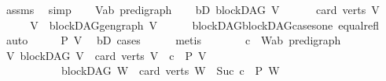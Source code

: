 \begin{isabellebody}
\ assms{\isacharparenleft}{\kern0pt}{}{\isacharparenright}{\kern0pt}\ \isamarkupfalse%
\ simp\isanewline
{}\isamarkupfalse%
\isanewline
\ \ \isamarkupfalse%
\ V{\isacharcolon}{\kern0pt}{\isacharcolon}{\kern0pt}{\isachardoublequoteopen}{\isacharparenleft}{\kern0pt}{\isacharprime}{\kern0pt}a{\isacharcomma}{\kern0pt}{\isacharprime}{\kern0pt}b{\isacharparenright}{\kern0pt}\ pre{\isacharunderscore}{\kern0pt}digraph{\isachardoublequoteclose}\isanewline
\ \ \isamarkupfalse%
\ bD{\isacharcolon}{\kern0pt}\ {\isachardoublequoteopen}blockDAG\ V{\isachardoublequoteclose}\ \isanewline
\ \ \ \ \ {\isachardoublequoteopen}card\ {\isacharparenleft}{\kern0pt}verts\ V{\isacharparenright}{\kern0pt}\ {\isacharequal}{\kern0pt}\ {}{\isachardoublequoteclose}\isanewline
\ \ \isamarkupfalse%
\ \isamarkupfalse%
\ {\isachardoublequoteopen}V\ {\isacharequal}{\kern0pt}\ blockDAG{\isachardot}{\kern0pt}gen{\isacharunderscore}{\kern0pt}graph\ V{\isachardoublequoteclose}\isanewline
\ \ \ \ \isamarkupfalse%
\ blockDAG{\isachardot}{\kern0pt}blockDAG{\isacharunderscore}{\kern0pt}cases{\isacharunderscore}{\kern0pt}one\ equal{\isacharunderscore}{\kern0pt}refl\ \ \isamarkupfalse%
\ auto\isanewline
\ \ \isamarkupfalse%
\ \isamarkupfalse%
\ {\isachardoublequoteopen}P\ V{\isachardoublequoteclose}\ \isamarkupfalse%
\ bD\ cases{\isacharparenleft}{\kern0pt}{}{\isacharparenright}{\kern0pt}\isanewline
\ \ \ \ \isamarkupfalse%
\ metis\ \ \isanewline
{}\isamarkupfalse%
\ \isanewline
\ \ \isamarkupfalse%
\ c\ \ W{\isacharcolon}{\kern0pt}{\isacharcolon}{\kern0pt}{\isachardoublequoteopen}{\isacharparenleft}{\kern0pt}{\isacharprime}{\kern0pt}a{\isacharcomma}{\kern0pt}{\isacharprime}{\kern0pt}b{\isacharparenright}{\kern0pt}\ pre{\isacharunderscore}{\kern0pt}digraph{\isachardoublequoteclose}\isanewline
\ \ \isamarkupfalse%
\ {\isachardoublequoteopen}{\isacharparenleft}{\kern0pt}{\isasymAnd}V{\isachardot}{\kern0pt}\ blockDAG\ V\ {\isasymLongrightarrow}\ card\ {\isacharparenleft}{\kern0pt}verts\ V{\isacharparenright}{\kern0pt}\ {\isacharequal}{\kern0pt}\ c\ {\isasymLongrightarrow}\ P\ V{\isacharparenright}{\kern0pt}\ {\isasymLongrightarrow}\isanewline
\ \ \ \ \ \ \ \ \ \ \ blockDAG\ W\ {\isasymLongrightarrow}\ card\ {\isacharparenleft}{\kern0pt}verts\ W{\isacharparenright}{\kern0pt}\ {\isacharequal}{\kern0pt}\ Suc\ c\ {\isasymLongrightarrow}\ P\ W{\isachardoublequoteclose}\isanewline

\end{isabellebody}
